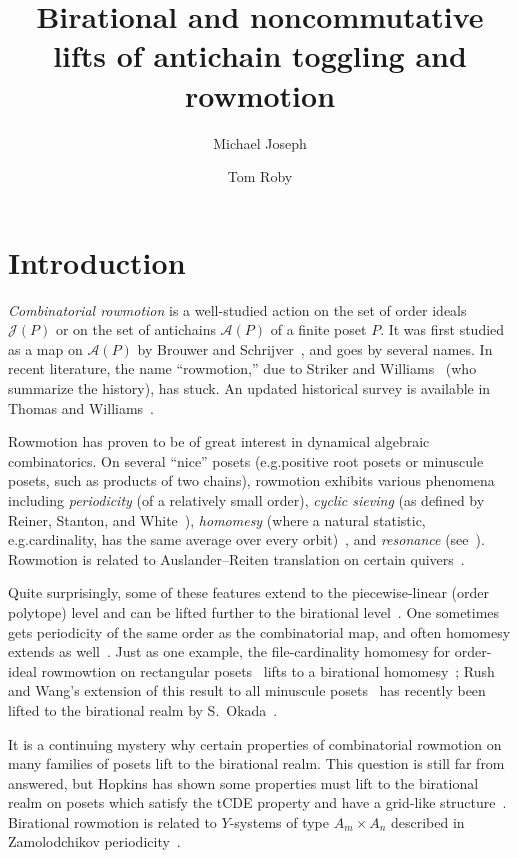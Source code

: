 \documentclass[10pt]{amsart}
\title{Birational and noncommutative lifts of antichain toggling and rowmotion}
\author{Michael Joseph}
\author{Tom Roby}
\theoremstyle{definition}
\newcommand{\eg}{e.g.}
\newcommand{\cala}{\mathcal{A}}
\newcommand{\calj}{\mathcal{J}}
\begin{document}
\maketitle
\section{Introduction}\label{sec:intro}

\textit{Combinatorial rowmotion} is a well-studied action on the set of order ideals
$\calj(P)$ or on the set of antichains $\cala(P)$ of a finite poset $P$. 
It was first studied as a map on $\cala(P)$
by Brouwer and Schrijver~\cite{brouwer1974period}, and goes by several names. In recent literature, the name 
``rowmotion,'' due to Striker and Williams~\cite{strikerwilliams} (who summarize the
history), has stuck. An updated historical survey is available in Thomas and
Williams~\cite[\S~7]{rowmotion-in-slow-motion}.

Rowmotion has proven to be of great interest in dynamical algebraic combinatorics. On
several ``nice'' posets (\eg positive root posets or minuscule posets, such as products of
two chains), rowmotion exhibits various phenomena including \emph{periodicity} (of a relatively
small order), \emph{cyclic sieving} (as defined by Reiner, Stanton, and White~\cite{csp}),
\emph{homomesy} (where a natural statistic, \eg cardinality, has the same average over every
orbit)~\cite{ast,shahrzad,indepsetspaper,panyushev,propproby,rush-wang-homomesy-minuscule,vorland-thesis,vorland-3-chains},
and \emph{resonance} (see~\cite{dpsresonance,dilks-striker-vorland}).
Rowmotion is related to Auslander--Reiten translation on certain quivers~\cite{Yil17}. 

Quite surprisingly, some of these features extend to the piecewise-linear (order polytope)
level and can be lifted further to the birational level~\cite{einpropp}. One sometimes
gets periodicity of the same order as the combinatorial map, and often homomesy extends as
well~\cite{GrRo15,GrRo16,musiker-roby}. Just as one example, the file-cardinality homomesy
for order-ideal rowmowtion on rectangular posets~\cite[Thm.~19ff]{propproby} lifts to a birational
homomesy~\cite[Thm.~2.16]{musiker-roby}; Rush and Wang's extension of this result to all minuscule
posets~\cite[Thm.~1.2]{rush-wang-homomesy-minuscule} has recently been lifted to the birational
realm by S.~Okada~\cite{okada-minuscule}.


It is a continuing mystery why certain properties of combinatorial rowmotion on
many families of posets lift to the birational realm.
This question is still far from answered, but Hopkins has shown
some properties must lift to the birational realm on posets which satisfy the tCDE property and have a grid-like structure~\cite{hopkins2019minuscule}.
Birational rowmotion is related to $Y$-systems of type $A_m \times A_n$ described in
Zamolodchikov periodicity~\cite[\S~4.4]{robydac}.
\end{document}
